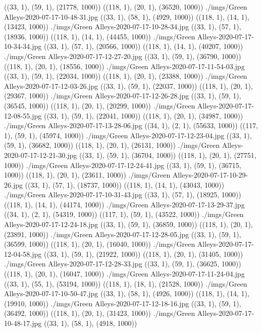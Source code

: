 ((33, 1), (59, 1), (21778, 1000))
((118, 1), (20, 1), (36520, 1000))
./imgs/Green Alleys-2020-07-17-10-48-31.jpg
((33, 1), (58, 1), (4929, 1000))
((118, 1), (14, 1), (13423, 1000))
./imgs/Green Alleys-2020-07-17-10-28-34.jpg
((33, 1), (57, 1), (18936, 1000))
((118, 1), (14, 1), (44455, 1000))
./imgs/Green Alleys-2020-07-17-10-34-34.jpg
((33, 1), (57, 1), (20566, 1000))
((118, 1), (14, 1), (40207, 1000))
./imgs/Green Alleys-2020-07-17-12-27-20.jpg
((33, 1), (59, 1), (36790, 1000))
((118, 1), (20, 1), (18556, 1000))
./imgs/Green Alleys-2020-07-17-11-54-03.jpg
((33, 1), (59, 1), (22034, 1000))
((118, 1), (20, 1), (23388, 1000))
./imgs/Green Alleys-2020-07-17-12-03-26.jpg
((33, 1), (59, 1), (22037, 1000))
((118, 1), (20, 1), (29367, 1000))
./imgs/Green Alleys-2020-07-17-12-26-28.jpg
((33, 1), (59, 1), (36545, 1000))
((118, 1), (20, 1), (20299, 1000))
./imgs/Green Alleys-2020-07-17-12-08-55.jpg
((33, 1), (59, 1), (22041, 1000))
((118, 1), (20, 1), (34987, 1000))
./imgs/Green Alleys-2020-07-17-13-28-06.jpg
((34, 1), (2, 1), (55633, 1000))
((117, 1), (59, 1), (45974, 1000))
./imgs/Green Alleys-2020-07-17-12-23-04.jpg
((33, 1), (59, 1), (36682, 1000))
((118, 1), (20, 1), (26131, 1000))
./imgs/Green Alleys-2020-07-17-12-21-30.jpg
((33, 1), (59, 1), (36704, 1000))
((118, 1), (20, 1), (27751, 1000))
./imgs/Green Alleys-2020-07-17-12-24-41.jpg
((33, 1), (59, 1), (36715, 1000))
((118, 1), (20, 1), (23611, 1000))
./imgs/Green Alleys-2020-07-17-10-29-26.jpg
((33, 1), (57, 1), (18737, 1000))
((118, 1), (14, 1), (43043, 1000))
./imgs/Green Alleys-2020-07-17-10-31-43.jpg
((33, 1), (57, 1), (18925, 1000))
((118, 1), (14, 1), (44174, 1000))
./imgs/Green Alleys-2020-07-17-13-29-37.jpg
((34, 1), (2, 1), (54319, 1000))
((117, 1), (59, 1), (43522, 1000))
./imgs/Green Alleys-2020-07-17-12-24-18.jpg
((33, 1), (59, 1), (36859, 1000))
((118, 1), (20, 1), (23891, 1000))
./imgs/Green Alleys-2020-07-17-12-28-05.jpg
((33, 1), (59, 1), (36599, 1000))
((118, 1), (20, 1), (16040, 1000))
./imgs/Green Alleys-2020-07-17-12-04-58.jpg
((33, 1), (59, 1), (21922, 1000))
((118, 1), (20, 1), (31405, 1000))
./imgs/Green Alleys-2020-07-17-12-28-33.jpg
((33, 1), (59, 1), (36625, 1000))
((118, 1), (20, 1), (16047, 1000))
./imgs/Green Alleys-2020-07-17-11-24-04.jpg
((33, 1), (55, 1), (53194, 1000))
((118, 1), (18, 1), (21528, 1000))
./imgs/Green Alleys-2020-07-17-10-50-47.jpg
((33, 1), (58, 1), (4926, 1000))
((118, 1), (14, 1), (19910, 1000))
./imgs/Green Alleys-2020-07-17-12-18-16.jpg
((33, 1), (59, 1), (36492, 1000))
((118, 1), (20, 1), (31423, 1000))
./imgs/Green Alleys-2020-07-17-10-48-17.jpg
((33, 1), (58, 1), (4918, 1000))
